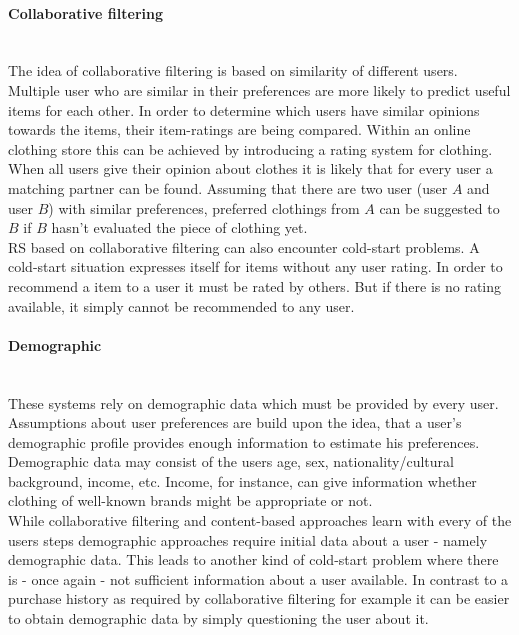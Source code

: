 \paragraph{Collaborative filtering}\hfill\\
The idea of collaborative filtering is based on similarity of different users.
Multiple user who are similar in their preferences are more likely to predict useful items for each other.
In order to determine which users have similar opinions towards the items, their item-ratings are being compared.
\citep[p.~291-292]{schafer:2007}
Within an online clothing store this can be achieved by introducing a rating system for clothing.
When all users give their opinion about clothes it is likely that for every user a matching partner can be found.
Assuming that there are two user (user $A$ and user $B$) with similar preferences, preferred clothings from $A$ can be suggested to $B$ if $B$ hasn't evaluated the piece of clothing yet.
\\
RS based on collaborative filtering can also encounter cold-start problems.
A cold-start situation expresses itself for items without any user rating.
In order to recommend a item to a user it must be rated by others.
But if there is no rating available, it simply cannot be recommended to any user.
\citep[p.~378-379]{burke:2007}

\paragraph{Demographic}\hfill\\
These systems rely on demographic data which must be provided by every user.
Assumptions about user preferences are build upon the idea, that a user's demographic profile provides enough information to estimate his preferences.
Demographic data may consist of the users age, sex, nationality/cultural background, income, etc.\citep[p.~12]{ricci:2011}
Income, for instance, can give information whether clothing of well-known brands might be appropriate or not.
\\
While collaborative filtering and content-based approaches learn with every of the users steps demographic approaches require initial data about a user - namely demographic data.
This leads to another kind of cold-start problem where there is - once again - not sufficient information about a user available.
In contrast to a purchase history as required by collaborative filtering for example it can be easier to obtain demographic data by simply questioning the user about it.

